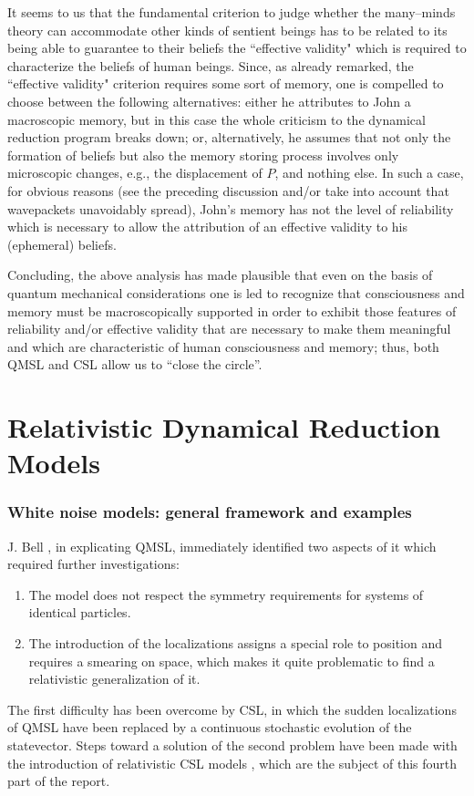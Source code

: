 \documentclass[10pt,a4paper]{article}
\begin{document}
It seems to us that the fundamental criterion to judge whether the
many--minds theory can accommodate other kinds of sentient beings
has to be related to its being able to guarantee to their beliefs
the ``effective validity" which is required to characterize the
beliefs of human beings. Since, as already remarked, the
``effective validity" criterion requires some sort of memory, one
is compelled to choose between the following alternatives: either
he attributes to John a macroscopic memory, but in this case the
whole criticism to the dynamical reduction program breaks down;
or, alternatively, he assumes that not only the formation of
beliefs but also the memory storing process involves only
microscopic changes, e.g., the displacement of $P$, and nothing
else. In such a case, for obvious reasons (see the preceding
discussion and/or take into account that wavepackets unavoidably
spread), John's memory has not the level of reliability which is
necessary to allow the attribution of an effective validity to his
(ephemeral) beliefs.

Concluding, the above analysis has made plausible that even on the
basis of quantum mechanical considerations one is led to recognize
that consciousness and memory must be macroscopically supported in
order to exhibit those features of reliability and/or effective
validity that are necessary to make them meaningful and which are
characteristic of human consciousness and memory; thus, both QMSL
and CSL allow us to ``close the circle''.




\part{Relativistic Dynamical Reduction Models}

\section{White noise models: general framework and examples}
\label{sec9}


J. Bell \cite{bells}, in explicating QMSL, immediately identified
two aspects of it which required further investigations:
\begin{enumerate}
\item The model does not respect the symmetry requirements for systems
of identical particles.
\item The introduction of the localizations assigns a special role to
position and requires a smearing on space, which makes it quite
problematic to find a relativistic generalization of it.
\end{enumerate}
The first difficulty has been overcome by CSL, in which the sudden
localizations of QMSL have been replaced by a continuous
stochastic evolution of the statevector. Steps toward a solution
of the second problem have been made with the introduction of
relativistic CSL models \cite{rel,rel2,p62,rel3,rel4}, which are the
subject of this fourth part of the report.
\end{document}
